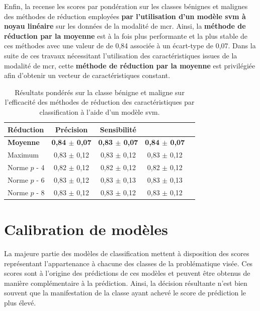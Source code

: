 Enfin, la  recense les scores par pondération sur les classes bénignes et malignes des méthodes de réduction employées \textbf{par l'utilisation d'un modèle \gls{svm} à noyau linéaire} sur les données de la modalité de \gls{mcr}. Ainsi, la \textbf{méthode de réduction par la moyenne} est à la fois plus performante et la plus stable de ces méthodes avec une valeur de \fscore{} de 0,84 associée à un écart-type de 0,07. Dans la suite de ces travaux nécessitant l'utilisation des caractéristiques issues de la modalité de \gls{mcr}, cette \textbf{méthode de réduction par la moyenne} est privilégiée afin d'obtenir un vecteur de caractéristiques constant.\par

\begin{table}[H]
    \centering
    \begin{tabular}{lcccc} \toprule
        Réduction           & Précision                 & Sensibilité               & \Fscore{}                 \\ \midrule
        \textbf{Moyenne}    & \textbf{0,84 $\pm$ 0,07}  & \textbf{0,83 $\pm$ 0,07}  & \textbf{0,84 $\pm$ 0,07}  \\
        Maximum             & 0,83 $\pm$ 0,12           & 0,83 $\pm$ 0,12           & 0,83 $\pm$ 0,12           \\
        Norme $p$ - 4       & 0,82 $\pm$ 0,12           & 0,82 $\pm$ 0,12           & 0,82 $\pm$ 0,12           \\
        Norme $p$ - 6       & 0,83 $\pm$ 0,12           & 0,83 $\pm$ 0,13           & 0,83 $\pm$ 0,13           \\
        Norme $p$ - 8       & 0,83 $\pm$ 0,12           & 0,83 $\pm$ 0,12           & 0,83 $\pm$ 0,12           \\ \bottomrule
    \end{tabular}
    \caption{Résultats pondérés sur la classe bénigne et maligne sur l'efficacité des méthodes de réduction des caractéristiques par classification à l'aide d'un modèle \gls{svm}.}
    \label{tab:results_multimodality_weighted_microscopy}
\end{table}

\clearpage

\section{Calibration de modèles}
\label{sec:calibrate_models}
La majeure partie des modèles de classification mettent à disposition des scores représentant l'appartenance à chacune des classes de la problématique visée. Ces scores sont à l'origine des prédictions de ces modèles et peuvent être obtenus de manière complémentaire à la prédiction. Ainsi, la décision résultante n'est bien souvent que la manifestation de la classe ayant achevé le score de prédiction le plus élevé.\par

